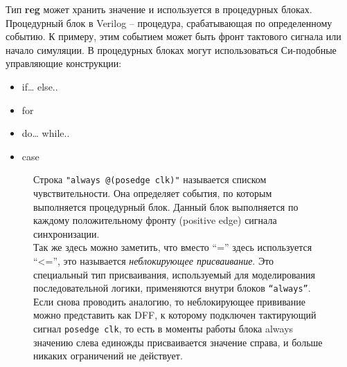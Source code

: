 \documentclass[a4paper,12pt]{article} %
\begin{document}
Тип \textbf{reg} может хранить значение и используется в процедурных блоках. Процедурный блок в Verilog – процедура, срабатывающая по определенному событию. К примеру, этим событием может быть фронт тактового сигнала или начало симуляции. В процедурных блоках могут использоваться Си-подобные управляющие конструкции:
\begin{itemize}
    \item if… else..
    \item for
    \item do… while..
    \item case
\end{itemize}

\begin{figure}[H]
    \begin{minipage}[t]{0.55\textwidth}
        \vspace{0pt} %
        Строка \texttt{"always @(posedge clk)"} называется списком чувствительности. Она определяет события, по которым выполняется процедурный блок. Данный блок выполняется по каждому положительному фронту (positive edge) сигнала синхронизации.\\

        Так же здесь можно заметить, что вместо ``='' здесь используется ``<='', это называется \textit{неблокирующее присваивание}. Это специальный тип присваивания, используемый для моделирования последовательной логики, применяются внутри блоков \texttt{``always''}. Если снова проводить аналогию, то неблокирующее прививание можно представить как DFF, к которому подключен тактирующий сигнал \texttt{posedge clk}, то есть в моменты работы блока always значению слева единожды присваивается значение справа, и больше никаких ограничений не действует.\\


\end{minipage}
\end{figure}
\end{document}
